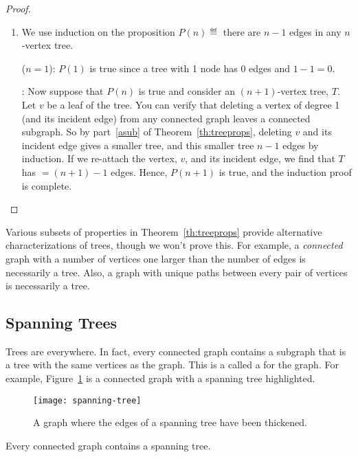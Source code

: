 \begin{proof}
\begin{enumerate}
\item We use induction on the proposition $P(n) \eqdef {}$ there are
  $n - 1$ edges in any $n$-vertex tree.

 ($n = 1$): $P(1)$ is true since a tree with
1 node has 0 edges and $1 - 1 = 0$.

: Now suppose that $P(n)$ is true and
consider an $(n+1)$-vertex tree, $T$.  Let $v$ be a leaf of the tree.
You can verify that deleting a vertex of degree 1 (and its incident
edge) from any connected graph leaves a connected subgraph.  So by
part~\ref{asub} of Theorem~\ref{th:treeprops}, deleting $v$ and its
incident edge gives a smaller tree, and this smaller tree $n - 1$
edges by induction.  If we re-attach the vertex, $v$, and its incident
edge, we find that $T$ has $ = (n + 1) - 1$ edges.  Hence, $P(n + 1)$
is true, and the induction proof is complete.  \qedhere

\end{enumerate}

\end{proof}

Various subsets of properties in Theorem~\ref{th:treeprops} provide
alternative characterizations of trees, though we won't prove this.
For example, a \emph{connected} graph with a number of vertices one
larger than the number of edges is necessarily a tree.  Also, a graph
with unique paths between every pair of vertices is necessarily a
tree.

\subsection{Spanning Trees}

Trees are everywhere.  In fact, every connected graph contains a
subgraph that is a tree with the same vertices as the graph.  This is
a called a  for the graph.  For example,
Figure~\ref{fig:5LL} is a connected graph with a spanning tree
highlighted.

\begin{figure}\redrawn

\texttt{[image: spanning-tree]}

\caption{A graph where the edges of a spanning tree have been
  thickened.}

\label{fig:5LL}

\end{figure}

\begin{theorem}
Every connected graph contains a spanning tree.
\end{theorem}

